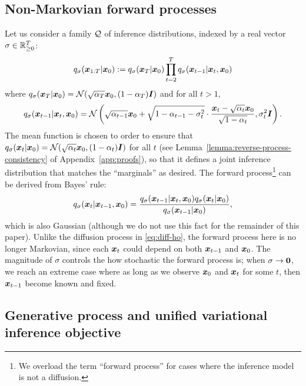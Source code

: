 \subsection{Non-Markovian forward processes} 
Let us consider a family ${\mathcal{Q}}$ of inference distributions, %
indexed by a real vector $\sigma \in \mathbb{R}_{\geq 0}^{T}$:
\begin{gather}
    q_\sigma({\bm{x}}_{1:T} | {\bm{x}}_0) := q_\sigma({\bm{x}}_T | {\bm{x}}_0) \prod_{t=2}^{T} q_\sigma({\bm{x}}_{t-1} | {\bm{x}}_{t}, {\bm{x}}_0) \label{eq:diff-new}
\end{gather}
where $q_\sigma({\bm{x}}_{T} | {\bm{x}}_0) = {\mathcal{N}}(\sqrt{\alpha_T} {\bm{x}}_0, (1 - \alpha_T) {\bm{I}})$ and for all $t > 1$,
\begin{gather} 
   q_\sigma({\bm{x}}_{t-1} | {\bm{x}}_t, {\bm{x}}_0) = {\mathcal{N}}\left(\sqrt{\alpha_{t-1}} {\bm{x}}_{0} + \sqrt{1 - \alpha_{t-1} - \sigma^2_t} \cdot {\frac{{\bm{x}}_{t}  - \sqrt{\alpha_{t}} {\bm{x}}_0}{\sqrt{1 - \alpha_{t}}}}, \sigma_t^2 {\bm{I}} \right). \label{eq:reversed-close-form}
\end{gather}
The mean function is chosen to order to ensure that $q_\sigma({\bm{x}}_{t} | {\bm{x}}_0) = {\mathcal{N}}(\sqrt{\alpha_t} {\bm{x}}_0, (1 - \alpha_t) {\bm{I}})$ for all $t$ 
(see Lemma~\ref{lemma:reverse-process-consistency} of Appendix~\ref{app:proofs}), so that it defines a joint inference distribution that matches the ``marginals'' as desired. %
The forward process\footnote{We overload the term ``forward process'' for cases where the inference model is not a diffusion.} can be derived from Bayes' rule:
\begin{align}
    q_\sigma({\bm{x}}_{t} | {\bm{x}}_{t-1}, {\bm{x}}_0) = \frac{q_\sigma({\bm{x}}_{t-1} | {\bm{x}}_{t}, {\bm{x}}_0) q_\sigma({\bm{x}}_{t} | {\bm{x}}_0)}{q_\sigma({\bm{x}}_{t-1} | {\bm{x}}_0)}, \label{eq:bayes-rule}
\end{align}
which is %
also Gaussian (although we do not use this fact for the remainder of this paper).
Unlike the diffusion process in \eqref{eq:diff-ho}, %
the forward process here is no longer Markovian, since each ${\bm{x}}_t$ could depend on both ${\bm{x}}_{t-1}$ and ${\bm{x}}_0$. The magnitude of $\sigma$ controls the how stochastic the forward process is; when $\sigma \to {\bm{0}}$, %
we reach an extreme case where as long as we observe ${\bm{x}}_0$ and ${\bm{x}}_t$ for some $t$, then ${\bm{x}}_{t-1}$ become known and fixed. %



\subsection{Generative process and unified variational inference objective}


